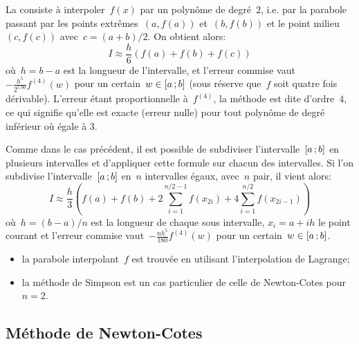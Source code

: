 La  consiste à interpoler~$f(x)$ par un polynôme de degré~$2$, i.e. par la parabole passant par les points extrêmes~$(a,f(a))$ et~$(b,f(b))$ et le point milieu~$(c,f(c))$ avec~$c=(a+b)/2$. On obtient alors: 
\begin{equation}
 I\approx \frac{h}{6} \left( f(a)+f(b)+f(c)\right)
\end{equation}
où~$h=b-a$ est la longueur de l'intervalle, et l'erreur commise vaut~$-\frac{h^5}{2^5.90} f^{(4)}(w)$ pour un certain~$w\in\mathopen{[}a\,;b\mathclose{]}$ (sous réserve que~$f$ soit quatre fois dérivable). L'erreur étant proportionnelle à~$f^{(4)}$, la méthode est dite d'ordre~$4$, ce qui signifie qu'elle est exacte (erreur nulle) pour tout polynôme de degré inférieur où égale à 3. 

Comme dans le cas précédent, il est possible de subdiviser l'intervalle~$\mathopen{[}a\,;b\mathclose{]}$ en plusieurs intervalles et d'appliquer cette formule sur chacun des intervalles. Si l'on subdivise l'intervalle~$\mathopen{[}a\,;b\mathclose{]}$ en~$n$ intervalles égaux, avec~$n$ pair, il vient alors: 
\begin{equation}
 I\approx \frac{h}{3} \left( f(a)+f(b)+2\sum_{i=1}^{n/2-1}f(x_{2i})+4\sum_{i=1}^{n/2}f(x_{2i-1}) \right)
\end{equation}
où~$h=(b-a)/n$ est la longueur de chaque sous intervalle, $x_i=a+ih$ le point courant et l'erreur commise vaut~$-\frac{nh^5}{180} f^{(4)}(w)$ pour un certain~$w\in\mathopen{[}a\,;b\mathclose{]}$. 
\medskipvm
\begin{remarque}[Remarques]\mbox{}
\begin{itemize}
\item la parabole interpolant~$f$ est trouvée en utilisant l'interpolation de Lagrange; 
\item la méthode de Simpson est un cas particulier de celle de Newton-Cotes pour~$n=2$. 
\end{itemize}
\end{remarque}

\medskip
\subsection*{Méthode de Newton-Cotes} 

